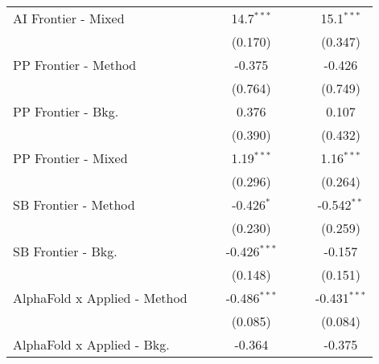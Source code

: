 \begin{tabular}{lcccccc}
   AI Frontier - Mixed            &                &                & 14.7$^{***}$   &                &                & 15.1$^{***}$\\   
                                  &                &                & (0.170)        &                &                & (0.347)\\   
   PP Frontier - Method           &                &                & -0.375         &                &                & -0.426\\   
                                  &                &                & (0.764)        &                &                & (0.749)\\   
   PP Frontier - Bkg.             &                &                & 0.376          &                &                & 0.107\\   
                                  &                &                & (0.390)        &                &                & (0.432)\\   
   PP Frontier - Mixed            &                &                & 1.19$^{***}$   &                &                & 1.16$^{***}$\\   
                                  &                &                & (0.296)        &                &                & (0.264)\\   
   SB Frontier - Method           &                &                & -0.426$^{*}$   &                &                & -0.542$^{**}$\\   
                                  &                &                & (0.230)        &                &                & (0.259)\\   
   SB Frontier - Bkg.             &                &                & -0.426$^{***}$ &                &                & -0.157\\   
                                  &                &                & (0.148)        &                &                & (0.151)\\   
   AlphaFold x Applied - Method   &                &                & -0.486$^{***}$ &                &                & -0.431$^{***}$\\   
                                  &                &                & (0.085)        &                &                & (0.084)\\   
   AlphaFold x Applied - Bkg.     &                &                & -0.364         &                &                & -0.375\\   

\end{tabular}
